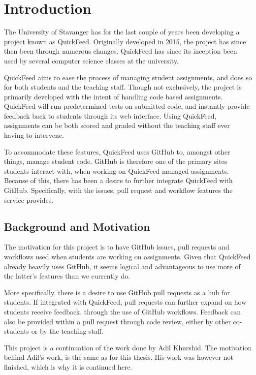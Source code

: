 
\chapter{Introduction}
\label{ch:intro}

The University of Stavanger has for the last couple of years been developing a project known as QuickFeed.
Originally developed in 2015, the project has since then been through numerous changes. %
QuickFeed has since its inception been used by several computer science classes at the university.

QuickFeed aims to ease the process of managing student assignments, and does so for both students and the teaching staff.
Though not exclusively, the project is primarily developed with the intent of handling code based assignments.
QuickFeed will run predetermined tests on submitted code, and instantly provide feedback back to students through its web interface.
Using QuickFeed, assignments can be both scored and graded without the teaching staff ever having to intervene.

To accommodate these features, QuickFeed uses GitHub to, amongst other things, manage student code.
GitHub is therefore one of the primary sites students interact with, when working on QuickFeed managed assignments.
Because of this, there has been a desire to further integrate QuickFeed with GitHub.
Specifically, with the issues, pull request and workflow features the service provides.

\section{Background and Motivation}
\label{sec:motivation}

The motivation for this project is to have GitHub issues, pull requests and workflows used when students are working on assignments.
Given that QuickFeed already heavily uses GitHub, it seems logical and advantageous to use more of the latter's features than we currently do.

More specifically, there is a desire to use GitHub pull requests as a hub for students.
If integrated with QuickFeed, pull requests can further expand on how students receive feedback, through the use of GitHub workflows.
Feedback can also be provided within a pull request through code review, either by other co-students or by the teaching staff.

This project is a continuation of the work done by Adil Khurshid. %
The motivation behind Adil's work, is the same as for this thesis.
His work was however not finished, which is why it is continued here.

